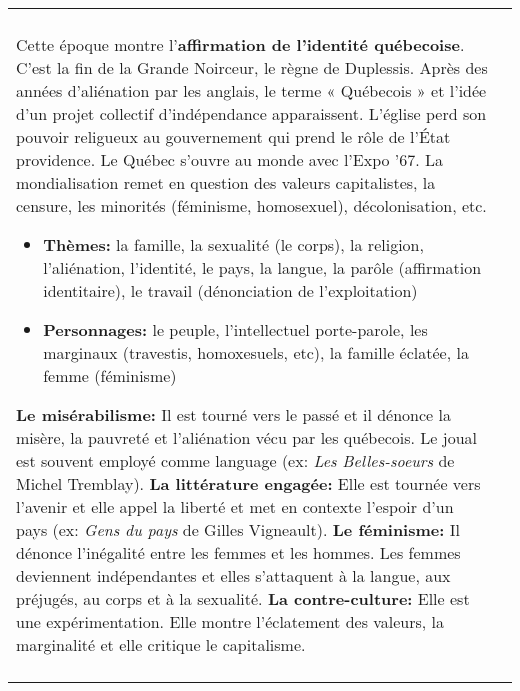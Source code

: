 \documentclass[11pt]{article}
\newcommand{\titre}[1]{{\Large\textbf{#1}}}
\begin{document}
\begin{tabularx}{\textwidth}{@{}XX@{}}
  \begin{minipage}[t]{\linewidth\fboxsep\fboxrule}
    \titre{Âge de la parole (1960-1980)}\\
    Cette époque montre l'\textbf{affirmation de l'identité québecoise}. C'est la fin de la Grande Noirceur, le règne de Duplessis. Après des années d'aliénation par les anglais, le terme « Québecois » et l'idée d'un projet collectif d'indépendance apparaissent. L'église perd son pouvoir religueux au gouvernement qui prend le rôle de l'État providence. Le Québec s'ouvre au monde avec l'Expo '67. La mondialisation remet en question des valeurs capitalistes, la censure, les minorités (féminisme, homosexuel), décolonisation, etc. 
    \begin{itemize}
      \item\textbf{Thèmes:} la famille, la sexualité (le corps), la religion, l'aliénation, l'identité, le pays, la langue, la parôle (affirmation identitaire), le travail (dénonciation de l'exploitation)
      \item\textbf{Personnages:} le peuple, l'intellectuel porte-parole, les marginaux (travestis, homoxesuels, etc), la famille éclatée, la femme (féminisme)
    \end{itemize}
    \textbf{Le misérabilisme:} Il est tourné vers le passé et il dénonce la misère, la pauvreté et l'aliénation vécu par les québecois. Le joual est souvent employé comme language (ex: \textit{Les Belles-soeurs} de Michel Tremblay). \textbf{La littérature engagée:} Elle est tournée vers l'avenir et elle appel la liberté et met en contexte l'espoir d'un pays (ex: \textit{Gens du pays} de Gilles Vigneault). \textbf{Le féminisme:} Il dénonce l'inégalité entre les femmes et les hommes. Les femmes deviennent indépendantes et elles s'attaquent à la langue, aux préjugés, au corps et à la sexualité. \textbf{La contre-culture:} Elle est une expérimentation. Elle montre l'éclatement des valeurs, la marginalité et elle critique le capitalisme.\\
  \end{minipage}&
  

\end{tabularx}
\end{document}
